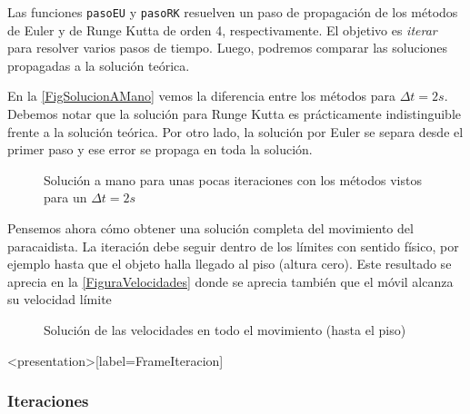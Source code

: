 
Las funciones \texttt{pasoEU} y \texttt{pasoRK} resuelven un paso de propagación de los métodos
de Euler y de Runge Kutta de orden 4, respectivamente. El objetivo es \emph{iterar} para resolver
varios pasos de tiempo. Luego, podremos comparar las soluciones propagadas a la solución 
teórica. 	

En la \autoref{FigSolucionAMano} vemos la diferencia entre los métodos para 
$\Delta t = 2s$. 
Debemos notar que la solución para Runge Kutta es prácticamente indistinguible frente a la solución teórica. 
Por otro lado, la solución por Euler se separa desde el primer paso y ese error se propaga en toda la 
solución.


\begin{figure}[h]

  \caption{\protect\label{FigSolucionAMano}
  Solución a mano para unas pocas iteraciones con los métodos vistos para un $\Delta t=2s$}
\end{figure}

Pensemos ahora cómo obtener una solución completa del movimiento del paracaidista. 
La iteración debe seguir dentro de los límites con sentido físico, por ejemplo 
hasta que el objeto halla llegado al piso (altura cero). 
Este resultado se aprecia en la \autoref{FiguraVelocidades} donde se aprecia también
que el móvil alcanza su velocidad límite

\begin{figure}[h]


  \caption{\protect\label{FiguraVelocidades} 
  Solución de las velocidades en todo el movimiento (hasta el piso)
  }

\end{figure}
\mode*

\begin{frame}<presentation>[label=FrameIteracion]
  \frametitle{Iteraciones}
\center
\end{frame}

